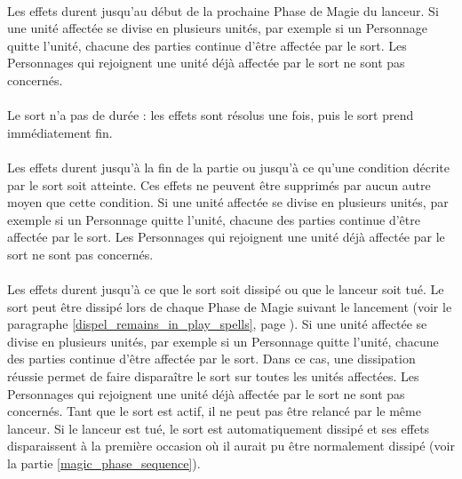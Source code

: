 \paragraph{\lastsoneturn}

Les effets durent jusqu'au début de la prochaine Phase de Magie du lanceur. Si une unité affectée se divise en plusieurs unités, par exemple si un Personnage quitte l'unité, chacune des parties continue d'être affectée par le sort. Les Personnages qui rejoignent une unité déjà affectée par le sort ne sont pas concernés.

\paragraph{\instant}

Le sort n'a pas de durée : les effets sont résolus une fois, puis le sort prend immédiatement fin.

\paragraph{\permanent}

Les effets durent jusqu'à la fin de la partie ou jusqu'à ce qu'une condition décrite par le sort soit atteinte. Ces effets ne peuvent être supprimés par aucun autre moyen que cette condition. Si une unité affectée se divise en plusieurs unités, par exemple si un Personnage quitte l'unité, chacune des parties continue d'être affectée par le sort. Les Personnages qui rejoignent une unité déjà affectée par le sort ne sont pas concernés.

\hypertarget{remainsinplay}{\paragraph{\remainsinplay}}

Les effets durent jusqu'à ce que le sort soit dissipé ou que le lanceur soit tué. Le sort peut être dissipé lors de chaque Phase de Magie suivant le lancement (voir le paragraphe \ref{dispel_remains_in_play_spells}, page \pageref{dispel_remains_in_play_spells}). Si une unité affectée se divise en plusieurs unités, par exemple si un Personnage quitte l'unité, chacune des parties continue d'être affectée par le sort. Dans ce cas, une dissipation réussie permet de faire disparaître le sort sur toutes les unités affectées. Les Personnages qui rejoignent une unité déjà affectée par le sort ne sont pas concernés. Tant que le sort est actif, il ne peut pas être relancé par le même lanceur. Si le lanceur est tué, le sort est automatiquement dissipé et ses effets disparaissent à la première occasion où il aurait pu être normalement dissipé (voir la partie \ref{magic_phase_sequence}).

